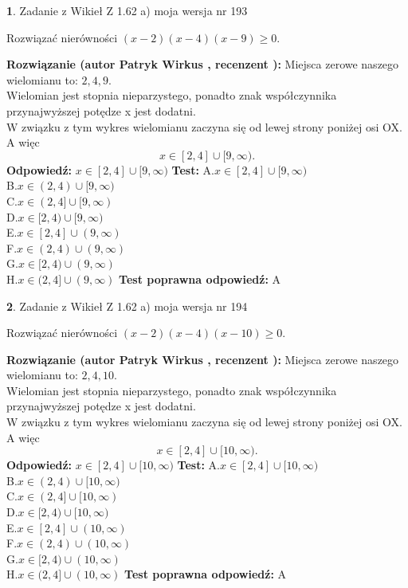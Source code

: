 \documentclass[12pt, a4paper]{article}
\theoremstyle{definition} %
\newtheorem{zad}{}
\newcommand{\zadStart}[1]{\begin{zad}#1\newline}
\newcommand{\zadStop}{\end{zad}}
\newcommand{\rozwStart}[2]{\noindent \textbf{Rozwiązanie (autor #1 , recenzent #2): }\newline}
\newcommand{\rozwStop}{\newline}
\newcommand{\odpStart}{\noindent \textbf{Odpowiedź:}\newline}
\newcommand{\odpStop}{\newline}
\newcommand{\testStart}{\noindent \textbf{Test:}\newline}
\newcommand{\testStop}{\newline}
\newcommand{\kluczStart}{\noindent \textbf{Test poprawna odpowiedź:}\newline}
\newcommand{\kluczStop}{\newline}
\begin{document}
\zadStart{Zadanie z Wikieł Z 1.62 a) moja wersja nr 193}

Rozwiązać nierówności $(x-2)(x-4)(x-9)\ge0$.
\zadStop
\rozwStart{Patryk Wirkus}{}
Miejsca zerowe naszego wielomianu to: $2, 4, 9$.\\
Wielomian jest stopnia nieparzystego, ponadto znak współczynnika przy\linebreak najwyższej potędze x jest dodatni.\\ W związku z tym wykres wielomianu zaczyna się od lewej strony poniżej osi OX. A więc $$x \in [2,4] \cup [9,\infty).$$
\rozwStop
\odpStart
$x \in [2,4] \cup [9,\infty)$
\odpStop
\testStart
A.$x \in [2,4] \cup [9,\infty)$\\
B.$x \in (2,4) \cup [9,\infty)$\\
C.$x \in (2,4] \cup [9,\infty)$\\
D.$x \in [2,4) \cup [9,\infty)$\\
E.$x \in [2,4] \cup (9,\infty)$\\
F.$x \in (2,4) \cup (9,\infty)$\\
G.$x \in [2,4) \cup (9,\infty)$\\
H.$x \in (2,4] \cup (9,\infty)$
\testStop
\kluczStart
A
\kluczStop



\zadStart{Zadanie z Wikieł Z 1.62 a) moja wersja nr 194}

Rozwiązać nierówności $(x-2)(x-4)(x-10)\ge0$.
\zadStop
\rozwStart{Patryk Wirkus}{}
Miejsca zerowe naszego wielomianu to: $2, 4, 10$.\\
Wielomian jest stopnia nieparzystego, ponadto znak współczynnika przy\linebreak najwyższej potędze x jest dodatni.\\ W związku z tym wykres wielomianu zaczyna się od lewej strony poniżej osi OX. A więc $$x \in [2,4] \cup [10,\infty).$$
\rozwStop
\odpStart
$x \in [2,4] \cup [10,\infty)$
\odpStop
\testStart
A.$x \in [2,4] \cup [10,\infty)$\\
B.$x \in (2,4) \cup [10,\infty)$\\
C.$x \in (2,4] \cup [10,\infty)$\\
D.$x \in [2,4) \cup [10,\infty)$\\
E.$x \in [2,4] \cup (10,\infty)$\\
F.$x \in (2,4) \cup (10,\infty)$\\
G.$x \in [2,4) \cup (10,\infty)$\\
H.$x \in (2,4] \cup (10,\infty)$
\testStop
\kluczStart
A
\kluczStop
\end{document}
